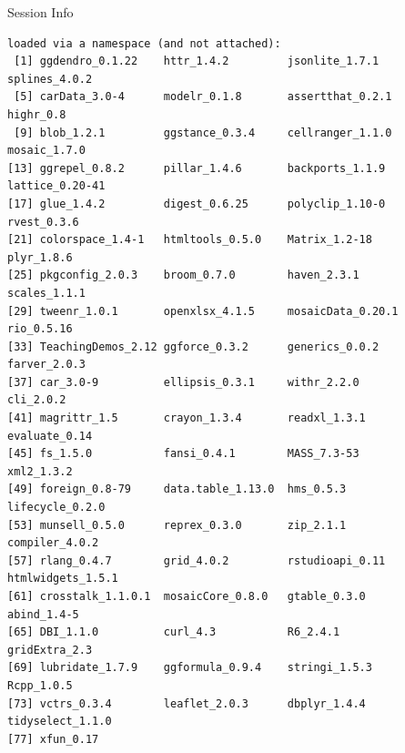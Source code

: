 \documentclass[10pt,handout]{beamer}\usepackage[]{graphicx}\usepackage[]{color}
\makeatletter
\newenvironment{kframe}{%
 \def\at@end@of@kframe{}%
 \ifinner\ifhmode%
  \def\at@end@of@kframe{\end{minipage}}%
  \begin{minipage}{\columnwidth}%
 \fi\fi%
 \def\FrameCommand##1{\hskip\@totalleftmargin \hskip-\fboxsep
 \colorbox{shadecolor}{##1}\hskip-\fboxsep
     \hskip-\linewidth \hskip-\@totalleftmargin \hskip\columnwidth}%
 \MakeFramed {\advance\hsize-\width
   \@totalleftmargin\z@ \linewidth\hsize
   \@setminipage}}%
 {\par\unskip\endMakeFramed%
 \at@end@of@kframe}
\newenvironment{knitrout}{}{} %
\makeatother
\begin{document}
\begin{frame}[fragile]{Session Info}
\begin{knitrout}
\begin{kframe}
\begin{verbatim}
loaded via a namespace (and not attached):
 [1] ggdendro_0.1.22    httr_1.4.2         jsonlite_1.7.1     splines_4.0.2     
 [5] carData_3.0-4      modelr_0.1.8       assertthat_0.2.1   highr_0.8         
 [9] blob_1.2.1         ggstance_0.3.4     cellranger_1.1.0   mosaic_1.7.0      
[13] ggrepel_0.8.2      pillar_1.4.6       backports_1.1.9    lattice_0.20-41   
[17] glue_1.4.2         digest_0.6.25      polyclip_1.10-0    rvest_0.3.6       
[21] colorspace_1.4-1   htmltools_0.5.0    Matrix_1.2-18      plyr_1.8.6        
[25] pkgconfig_2.0.3    broom_0.7.0        haven_2.3.1        scales_1.1.1      
[29] tweenr_1.0.1       openxlsx_4.1.5     mosaicData_0.20.1  rio_0.5.16        
[33] TeachingDemos_2.12 ggforce_0.3.2      generics_0.0.2     farver_2.0.3      
[37] car_3.0-9          ellipsis_0.3.1     withr_2.2.0        cli_2.0.2         
[41] magrittr_1.5       crayon_1.3.4       readxl_1.3.1       evaluate_0.14     
[45] fs_1.5.0           fansi_0.4.1        MASS_7.3-53        xml2_1.3.2        
[49] foreign_0.8-79     data.table_1.13.0  hms_0.5.3          lifecycle_0.2.0   
[53] munsell_0.5.0      reprex_0.3.0       zip_2.1.1          compiler_4.0.2    
[57] rlang_0.4.7        grid_4.0.2         rstudioapi_0.11    htmlwidgets_1.5.1 
[61] crosstalk_1.1.0.1  mosaicCore_0.8.0   gtable_0.3.0       abind_1.4-5       
[65] DBI_1.1.0          curl_4.3           R6_2.4.1           gridExtra_2.3     
[69] lubridate_1.7.9    ggformula_0.9.4    stringi_1.5.3      Rcpp_1.0.5        
[73] vctrs_0.3.4        leaflet_2.0.3      dbplyr_1.4.4       tidyselect_1.1.0  
[77] xfun_0.17         
\end{verbatim}
\end{kframe}
\end{knitrout}
	
\end{frame}
\end{document}
